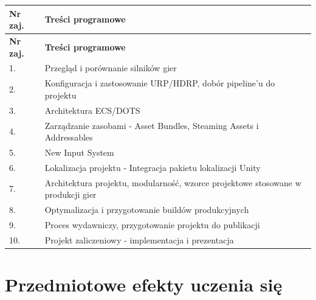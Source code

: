\documentclass[12pt, a4paper]{article}
\newcommand{\thdrule}{\noalign{\global\setlength{\extrarowheight}{0pt}}}
\newcommand{\thdend}{\noalign{\global\setlength{\extrarowheight}{3pt}}}
\begin{document}
{\scriptsize
\begin{longtable}{m{1.5cm}m{14.5cm}}
\thdrule\toprule
\rowcolor{pjatkRed} {\color{white}\textbf{Nr zaj.}} & {\color{white}\textbf{Treści programowe}} \\
\midrule\thdend
\endfirsthead
\thdrule\toprule
\rowcolor{pjatkRed} {\color{white}\textbf{Nr zaj.}} & {\color{white}\textbf{Treści programowe}} \\
\midrule\thdend
\endhead
  \rowcolor{tableRowLight} 1. & Przegląd i porównanie silników gier \\
  \rowcolor{tableRowAlt} 2. & Konfiguracja i zastosowanie URP/HDRP, dobór pipeline'u do projektu \\
  \rowcolor{tableRowLight} 3. & Architektura ECS/DOTS \\
  \rowcolor{tableRowAlt} 4. & Zarządzanie zasobami - Asset Bundles, Steaming Assets i Addressables \\
  \rowcolor{tableRowLight} 5. & New Input System \\
  \rowcolor{tableRowAlt} 6. & Lokalizacja projektu - Integracja pakietu lokalizacji Unity \\
  \rowcolor{tableRowLight} 7. & Architektura projektu, modularność, wzorce projektowe stosowane w produkcji gier \\
  \rowcolor{tableRowAlt} 8. & Optymalizacja i przygotowanie buildów produkcyjnych \\
  \rowcolor{tableRowLight} 9. & Proces wydawniczy, przygotowanie projektu do publikacji \\
  \rowcolor{tableRowAlt} 10. & Projekt zaliczeniowy - implementacja i prezentacja \\
\bottomrule
\end{longtable}}

\section{Przedmiotowe efekty uczenia się}
\end{document}
